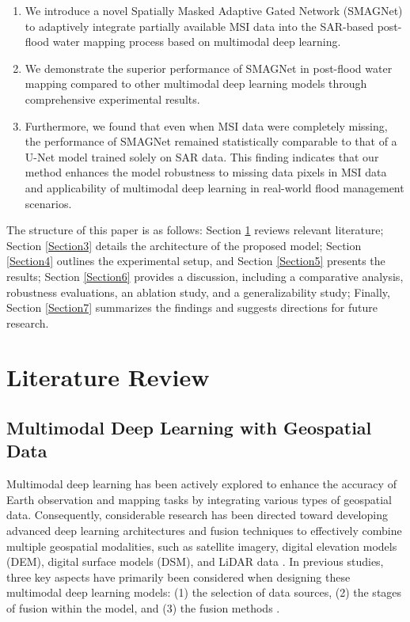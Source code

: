 \documentclass[preprint,12pt,authoryear]{elsarticle}
\begin{document}
\begin{enumerate}
    \renewcommand{\labelenumi}{\arabic{enumi})}  %
    \item We introduce a novel Spatially Masked Adaptive Gated Network (SMAGNet) to adaptively integrate partially available MSI data into the SAR-based post-flood water mapping process based on multimodal deep learning.
    \item We demonstrate the superior performance of SMAGNet in post-flood water mapping compared to other multimodal deep learning models through comprehensive experimental results.
    \item Furthermore, we found that even when MSI data were completely missing, the performance of SMAGNet remained statistically comparable to that of a U-Net model trained solely on SAR data. This finding indicates that our method enhances the model robustness to missing data pixels in MSI data and applicability of multimodal deep learning in real-world flood management scenarios.
\end{enumerate}

The structure of this paper is as follows: Section \ref{Section2} reviews relevant literature; Section \ref{Section3} details the architecture of the proposed model; Section \ref{Section4} outlines the experimental setup, and Section \ref{Section5} presents the results; Section \ref{Section6} provides a discussion, including a comparative analysis, robustness evaluations, an ablation study, and a generalizability study; Finally, Section \ref{Section7} summarizes the findings and suggests directions for future research.

\section{Literature Review}
\label{Section2}

\subsection{Multimodal Deep Learning with Geospatial Data}
\label{Section2.1}
Multimodal deep learning has been actively explored to enhance the accuracy of Earth observation and mapping tasks by integrating various types of geospatial data. Consequently, considerable research has been directed toward developing advanced deep learning architectures and fusion techniques to effectively combine multiple geospatial modalities, such as satellite imagery, digital elevation models (DEM), digital surface models (DSM), and LiDAR data \citep{huang2023deep, rolf2024mission}. In previous studies, three key aspects have primarily been considered when designing these multimodal deep learning models: (1) the selection of data sources, (2) the stages of fusion within the model, and (3) the fusion methods \citep{huang2023deep, kang2022cfnet, mena2024common}.
\end{document}
